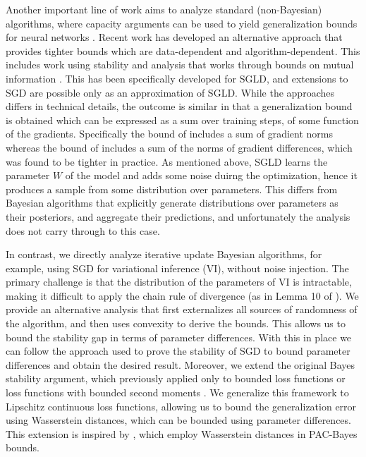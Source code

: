 Another important line of work aims to analyze standard (non-Bayesian) algorithms, where capacity arguments can be used to yield generalization bounds for neural networks \citep[e.g.,][]{nn-rademacher}.
Recent work has developed an alternative approach that provides tighter bounds which are data-dependent and algorithm-dependent. This includes work using stability 
\citep{Li,banerjee}
and analysis that works through bounds on mutual information
\citep{NegreaHDK019,HaghifamNK0D20}. 
This has been specifically developed for SGLD, and extensions to SGD \citep{Neu21} are possible only as an approximation of SGLD.
While the approaches differs in technical details, the outcome is similar in that a generalization bound is obtained which can be expressed as a sum over training steps, of some function of the gradients.
Specifically the bound of \cite{Li} includes a sum of gradient norms whereas the bound of \cite{banerjee} includes a sum of the norms of gradient differences, which was found to be tighter in practice. 
As mentioned above,  
SGLD learns the parameter $W$ of the model and adds some noise duirng the optimization, hence it produces a sample from some distribution over parameters. 
This differs from Bayesian algorithms that explicitly generate distributions over parameters as their posteriors, and aggregate their predictions, and unfortunately the analysis does not carry through to this case. 

In contrast, we directly analyze iterative update Bayesian algorithms, for example, using SGD for variational inference (VI), without noise injection. The primary challenge is that the distribution of the parameters of VI is intractable, making it difficult to apply the chain rule of divergence (as in Lemma 10 of \citet{Li}). 
We provide an alternative analysis that first externalizes all sources of randomness of the algorithm, and then uses convexity to derive the bounds. 
This 
allows us to bound the stability gap in terms of parameter differences.
With this in place we can
follow the approach used to prove the stability of SGD \citep{HardtRS16, SGD-stability2} to bound parameter differences and obtain the desired result.  
Moreover, we extend the original Bayes stability argument, which previously applied only to bounded loss functions \citep{Li} or loss functions with bounded second moments \citep{banerjee}. We generalize this framework to Lipschitz continuous loss functions, allowing us to bound the generalization error using Wasserstein distances, which can be bounded using parameter differences. This extension is inspired by \citet{ipm, wass-pac-bayes}, which employ Wasserstein distances in PAC-Bayes bounds.

